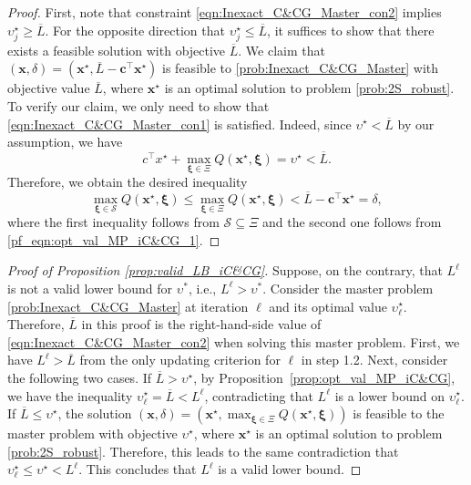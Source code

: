 \documentclass[preprint,review,11pt]{elsarticle}
\theoremstyle{definition}
\theoremstyle{remark}
\newcommand{\tp}{\top}
\newcommand{\calS}{\mathcal{S}}
\newcommand{\xb}{\pmb{x}}
\newcommand{\cb}{\pmb{c}}
\newcommand{\xib}{\pmb{\xi}}
\newcommand{\Lbar}{\overline{L}}
\begin{document}
\begin{proof}
First, note that constraint \eqref{eqn:Inexact_C&CG_Master_con2} implies $\upsilon_{j}^\star \geq \Lbar$. For the opposite direction that $\upsilon_{j}^\star \leq \Lbar$, it suffices to show that there exists a feasible solution with objective $\Lbar$. We claim that $(\xb,\delta)=(\xb^\star,\Lbar-\cb^\tp\xb^\star)$ is feasible to \eqref{prob:Inexact_C&CG_Master} with objective value $\Lbar$, where $\xb^\star$ is an optimal solution to problem \eqref{prob:2S_robust}. To verify our claim, we only need to show that \eqref{eqn:Inexact_C&CG_Master_con1} is satisfied. Indeed, since $\upsilon^\star < \Lbar$ by our assumption, we have
%
\begin{equation}  \label{pf_eqn:opt_val_MP_iC&CG_1}
 c^\tp x^\star + \max_{\xib\in\Xi} Q(\xb^\star,\xib)=\upsilon^\star < \Lbar.
\end{equation}
%
Therefore, we obtain the desired inequality
%
$$\max_{\xib\in\calS} Q(\xb^\star,\xib) \leq \max_{\xib\in\Xi} Q(\xb^\star,\xib) < \Lbar-\cb^\tp\xb^\star=\delta,$$
%
where the first inequality follows from $\calS\subseteq \Xi$ and the second one follows from \eqref{pf_eqn:opt_val_MP_iC&CG_1}. 
\end{proof}


\begin{proof}[Proof of Proposition \ref{prop:valid_LB_iC&CG}]
Suppose, on the contrary, that $L^\ell$ is not a valid lower bound for $\upsilon^*$, i.e., $L^\ell > \upsilon^*$. Consider the master problem \eqref{prob:Inexact_C&CG_Master} at iteration $\ell$ and its optimal value $\upsilon^\star_\ell$. Therefore, $\Lbar$ in this proof is the right-hand-side value of \eqref{eqn:Inexact_C&CG_Master_con2} when solving this master problem. First, we have $L^\ell> \Lbar$ from the only updating criterion for $\ell$ in step 1.2. Next, consider the following two cases. If $\Lbar > \upsilon^\star$, by Proposition~\ref{prop:opt_val_MP_iC&CG}, we have the inequality $\upsilon^\star_\ell = \Lbar < L^\ell$, contradicting that $L^\ell$ is a lower bound on $\upsilon_\ell^\star$. If $\Lbar \leq \upsilon^\star$, the solution $(\xb,\delta)=(\xb^\star,\max_{\xib\in\Xi} Q(\xb^\star,\xib))$ is feasible to the master problem with objective  $\upsilon^\star$, where $\xb^\star$ is an optimal solution to problem \eqref{prob:2S_robust}. Therefore, this leads to the same contradiction that $\upsilon^\star_{\ell} \leq \upsilon^\star<L^\ell$. This concludes that $L^\ell$ is a valid lower bound. 
\end{proof}
\end{document}
